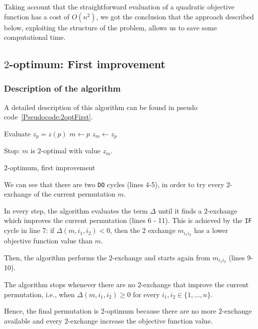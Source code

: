 Taking account that the straightforward evaluation of a quadratic objective function has a cost of $O(n^2)$, we got the conclusion that the approach described below, exploiting the structure of the problem, allows us to save some computational time.


\subsection{$2$-optimum: First improvement}

\subsubsection{Description of the algorithm}


\noindent A detailed description of this algorithm can be found in pseudo code~\ref{Pseudocode:2optFirst}.

\begin{algorithm}

	Evaluate $z_p = z(p)$\;
	$m \gets p$\; 
	$z_m \gets z_p$\;
	
	Stop: $m$ is  $2$-optimal with value $z_m$.	
	\caption{$2$-optimum, first improvement}
	\label{Pseudocode:2optFirst}
\end{algorithm}

We can see that there are two \texttt{DO} cycles (lines 4-5), in order to try every $2$-exchange of the current permutation $m$.

In every step, the algorithm evaluates the term $\Delta$ until it finds a $2$-exchange which improves the current permutation (lines 6 - 11).
This is achieved by the \texttt{IF} cycle in line 7: if $\Delta(m,i_1,i_2)<0$, then the $2$ exchange $m_{i_1i_2}$ has a lower objective function value than $m$.

Then, the algorithm performs the $2$-exchange and starts again from $m_{i_1i_2}$ (lines 9-10).

The algorithm stops whenever there are no $2$-exchange that improve the current permutation, i.e., when $\Delta(m,i_1,i_2)\ge 0$ for every $i_1,i_2\in\{1,\dots,n\}$.

Hence, the final permutation is $2$-optimum because there are no more $2$-exchange available and every $2$-exchange increase the objective function value.

